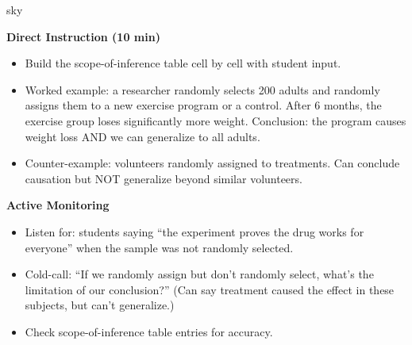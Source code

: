 \documentclass[10pt]{article}
\begin{document}
\begin{skillbox}{sky}
\begin{minipage}[t]{0.48\linewidth}
    \textbf{Direct Instruction (10 min)}
    \begin{itemize}
        \item Build the scope-of-inference table cell by cell with student input.
        \item Worked example: a researcher randomly selects 200 adults and randomly
              assigns them to a new exercise program or a control. After 6 months,
              the exercise group loses significantly more weight. Conclusion: the
              program causes weight loss AND we can generalize to all adults.
        \item Counter-example: volunteers randomly assigned to treatments. Can conclude
              causation but NOT generalize beyond similar volunteers.
    \end{itemize}
\end{minipage}
\hfill
\begin{minipage}[t]{0.48\linewidth}
    \textbf{Active Monitoring}
    \begin{itemize}
        \item Listen for: students saying ``the experiment proves the drug works for
              everyone'' when the sample was not randomly selected.
        \item Cold-call: ``If we randomly assign but don't randomly select, what's the
              limitation of our conclusion?'' (Can say treatment caused the effect in
              these subjects, but can't generalize.)
        \item Check scope-of-inference table entries for accuracy.
    \end{itemize}
\end{minipage}
\end{skillbox}
\end{document}
